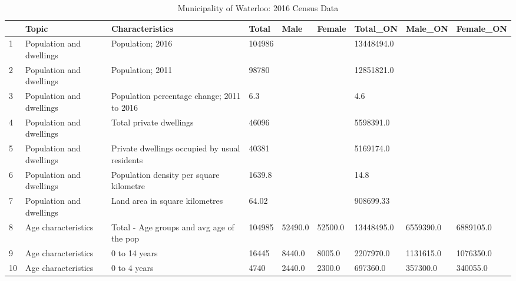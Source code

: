 \documentclass[10pt,a4paper]{report}
\begin{document}
	\begin{table}[H]
		\caption{Municipality of Waterloo: 2016 Census Data}
		\label{Waterloo_df}
		\begin{adjustbox}{width=1\textwidth}
			\small
			\begin{tabular}{@{}lllllllll@{}}
				\toprule
				& Topic                    & Characteristics                                                              & Total  & Male    & Female  & Total\_ON  & Male\_ON  & Female\_ON \\ \midrule
				1  & Population and dwellings & Population; 2016                                                             & 104986 &         &         & 13448494.0 &           &            \\
				2  & Population and dwellings & Population; 2011                                                             & 98780  &         &         & 12851821.0 &           &            \\
				3  & Population and dwellings & Population percentage change; 2011 to 2016                                   & 6.3    &         &         & 4.6        &           &            \\
				4  & Population and dwellings & Total private dwellings                                                      & 46096  &         &         & 5598391.0  &           &            \\
				5  & Population and dwellings & Private dwellings occupied by usual residents                                & 40381  &         &         & 5169174.0  &           &            \\
				6  & Population and dwellings & Population density per square kilometre                                      & 1639.8 &         &         & 14.8       &           &            \\
				7  & Population and dwellings & Land area in square kilometres                                               & 64.02  &         &         & 908699.33  &           &            \\
				8  & Age characteristics      & Total - Age groups and avg age of the pop            & 104985 & 52490.0 & 52500.0 & 13448495.0 & 6559390.0 & 6889105.0  \\
				9  & Age characteristics      & 0 to 14 years                                                                & 16445  & 8440.0  & 8005.0  & 2207970.0  & 1131615.0 & 1076350.0  \\
				10 & Age characteristics      & 0 to 4 years                                                                 & 4740   & 2440.0  & 2300.0  & 697360.0   & 357300.0  & 340055.0   \\

\end{tabular}
\end{adjustbox}
\end{table}
\end{document}
